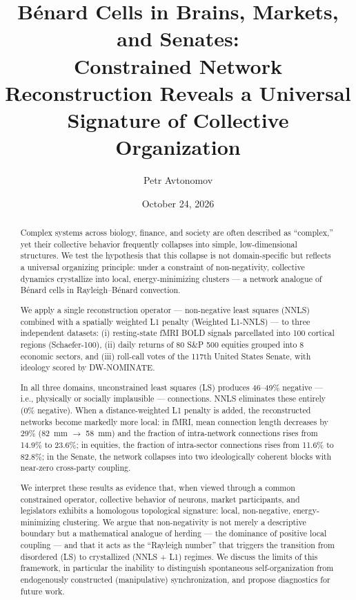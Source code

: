 \documentclass[11pt,a4paper]{article}
\title{\textbf{Bénard Cells in Brains, Markets, and Senates:\\ Constrained Network Reconstruction Reveals a Universal Signature of Collective Organization}}
\author[1]{Petr Avtonomov}
\affil[1]{Independent Researcher \\ ORCID: 0009-0003-2816-6782 \\ \texttt{avtonomovpetr@gmail.com}}
\date{October 24, 2026}
\begin{document}
\maketitle

\begin{abstract}
Complex systems across biology, finance, and society are often described as ``complex,'' yet their collective behavior frequently collapses into simple, low-dimensional structures. We test the hypothesis that this collapse is not domain-specific but reflects a universal organizing principle: under a constraint of non-negativity, collective dynamics crystallize into local, energy-minimizing clusters --- a network analogue of Bénard cells in Rayleigh--Bénard convection.

We apply a single reconstruction operator --- non-negative least squares (NNLS) combined with a spatially weighted L1 penalty (Weighted L1-NNLS) --- to three independent datasets: (i) resting-state fMRI BOLD signals parcellated into 100 cortical regions (Schaefer-100), (ii) daily returns of 80 S\&P 500 equities grouped into 8 economic sectors, and (iii) roll-call votes of the 117th United States Senate, with ideology scored by DW-NOMINATE.

In all three domains, unconstrained least squares (LS) produces 46--49\% negative --- i.e., physically or socially implausible --- connections. NNLS eliminates these entirely (0\% negative). When a distance-weighted L1 penalty is added, the reconstructed networks become markedly more local: in fMRI, mean connection length decreases by 29\% (82~mm $\rightarrow$ 58~mm) and the fraction of intra-network connections rises from 14.9\% to 23.6\%; in equities, the fraction of intra-sector connections rises from 11.6\% to 82.8\%; in the Senate, the network collapses into two ideologically coherent blocks with near-zero cross-party coupling.

We interpret these results as evidence that, when viewed through a common constrained operator, collective behavior of neurons, market participants, and legislators exhibits a homologous topological signature: local, non-negative, energy-minimizing clustering. We argue that non-negativity is not merely a descriptive boundary but a mathematical analogue of herding --- the dominance of positive local coupling --- and that it acts as the ``Rayleigh number'' that triggers the transition from disordered (LS) to crystallized (NNLS + L1) regimes. We discuss the limits of this framework, in particular the inability to distinguish spontaneous self-organization from endogenously constructed (manipulative) synchronization, and propose diagnostics for future work.
\end{abstract}
\end{document}
